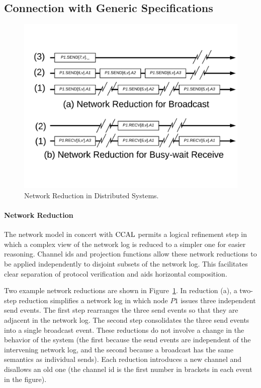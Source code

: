 \subsection{Connection with Generic Specifications}
\label{chapter:witnesspassing:subsec:connection}

\begin{figure}
\begin{center}
\includegraphics[scale=0.35]{figs/witnesspassing/network_reduction.pdf}
\end{center}
\caption{Network Reduction in Distributed Systems.}
\label{fig:chapter:witnesspassing:network-reduction}
\end{figure}

\paragraph{Network Reduction}
The network model in concert with $\mathrm{CCAL}$ permits a logical refinement step in
which a complex view of the network log is reduced to a simpler one for easier
reasoning. Channel ids and projection functions allow these network
reductions to be applied independently to disjoint subsets of the network log.
This facilitates clear separation of protocol verification and aids
horizontal composition.

Two example network reductions are shown in Figure~\ref{fig:chapter:witnesspassing:network-reduction}. In
reduction (a), a two-step reduction simplifies a network log in which node $P1$ issues three independent send events. The first step rearranges the three send
events so that they are adjacent in the network log. The second step
consolidates the three send events into a single broadcast event. These
reductions do not involve a change in the behavior of the system (the first because
the send events are independent of the intervening network log, and the second
because a broadcast has the same semantics as individual sends). Each reduction
introduces a new channel and disallows an old one (the channel id is the first
number in brackets in each event in the figure).

